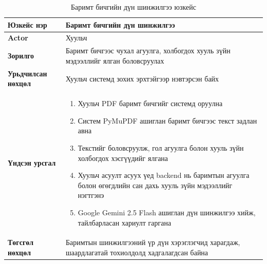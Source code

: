 \vspace{0.5cm}

\begin{table}[H]
\centering
\renewcommand{\arraystretch}{1.3}
\begin{tabular}{|p{3cm}|p{11cm}|}
\hline
\textbf{Юзкейс нэр} & Баримт бичгийн дүн шинжилгээ \\ \hline
\textbf{Actor} & Хуульч \\ \hline
\textbf{Зорилго} & Баримт бичгээс чухал агуулга, холбогдох хууль зүйн мэдээллийг ялган боловсруулах \\ \hline
\textbf{Урьдчилсан нөхцөл} & Хуульч системд зохих эрхтэйгээр нэвтэрсэн байх \\ \hline
\textbf{Үндсэн урсгал} & \begin{minipage}[t]{11cm}
\begin{enumerate}
    \item Хуульч PDF баримт бичгийг системд оруулна
    \item Систем PyMuPDF ашиглан баримт бичгээс текст задлан авна
    \item Текстийг боловсруулж, гол агуулга болон хууль зүйн холбогдох хэсгүүдийг ялгана
    \item Хуульч асуулт асуух үед backend нь баримтын агуулга болон өгөгдлийн сан дахь хууль зүйн мэдээллийг нэгтгэнэ
    \item Google Gemini 2.5 Flash ашиглан дүн шинжилгээ хийж, тайлбарласан хариулт гаргана
\end{enumerate}
\end{minipage} \\ \hline
\textbf{Төгсгөл нөхцөл} & Баримтын шинжилгээний үр дүн хэрэглэгчид харагдаж, шаардлагатай тохиолдолд хадгалагдсан байна \\ \hline
\end{tabular}
\caption{Баримт бичгийн дүн шинжилгээ юзкейс}
\end{table}

\vspace{0.5cm}

